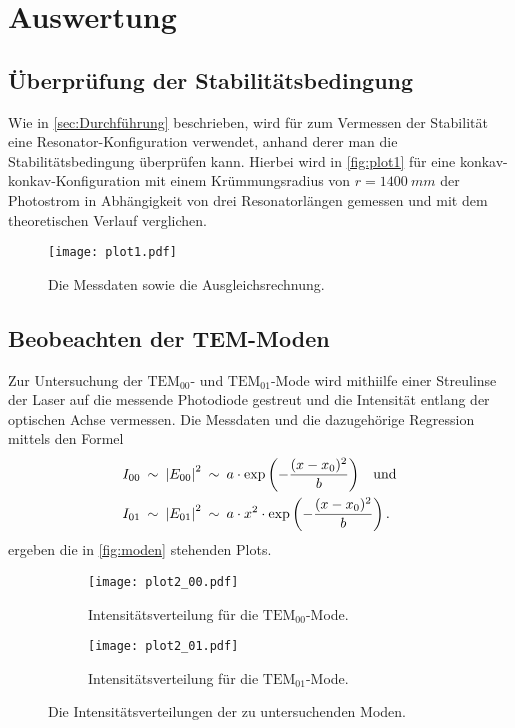 \section{Auswertung}
\label{sec:Auswertung}

\subsection{Überprüfung der Stabilitätsbedingung} \label{sec:stabilitaet}
Wie in \autoref{sec:Durchführung} beschrieben, 
wird für zum Vermessen der Stabilität eine Resonator-Konfiguration verwendet,
anhand derer man die Stabilitätsbedingung überprüfen kann.
Hierbei wird in \autoref{fig:plot1} für eine konkav-konkav-Konfiguration mit einem Krümmungsradius von $r = \qty{1400}{mm}$ der Photostrom in Abhängigkeit von drei Resonatorlängen gemessen
und mit dem theoretischen Verlauf verglichen.
\begin{figure}
    \centering
    \texttt{[image: plot1.pdf]}
    \caption{Die Messdaten sowie die Ausgleichsrechnung.}
    \label{fig:plot1}
\end{figure}


\subsection{Beobeachten der TEM-Moden} \label{sec:moden}
Zur Untersuchung der $\text{TEM}_{00}$- und $\text{TEM}_{01}$-Mode wird mithiilfe einer Streulinse
der Laser auf die messende Photodiode gestreut und die Intensität entlang der optischen Achse vermessen.
Die Messdaten und die dazugehörige Regression mittels den Formel
\begin{align}\label{eq:gauss}
    & I_{00} \: \sim \: {\lvert E_{00}\rvert}^2 \: \sim \: a \cdot           \exp{\left(-\frac{{(x-x_0)^2}}{b}\right)} \quad \text{und} \\
    & I_{01} \: \sim \: {\lvert E_{01}\rvert}^2 \: \sim \: a \cdot x^2 \cdot \exp{\left(-\frac{{(x-x_0)^2}}{b}\right)} \, .
\end{align}
ergeben die in \autoref{fig:moden} stehenden Plots.
\begin{figure}[H]
    \centering
    
    \begin{subfigure}{0.8\columnwidth}
        \centering
        \texttt{[image: plot2\_00.pdf]}
        \caption{Intensitätsverteilung für die $\text{TEM}_00$-Mode.}
        \label{fig:tem00}
    \end{subfigure}\hfill

    \begin{subfigure}{0.8\columnwidth}
        \centering
        \texttt{[image: plot2\_01.pdf]}
        \caption{Intensitätsverteilung für die $\text{TEM}_01$-Mode.}
        \label{fig:tem01}
    \end{subfigure}
  
    \caption{Die Intensitätsverteilungen der zu untersuchenden Moden.}
    \label{fig:moden}
  
\end{figure}



